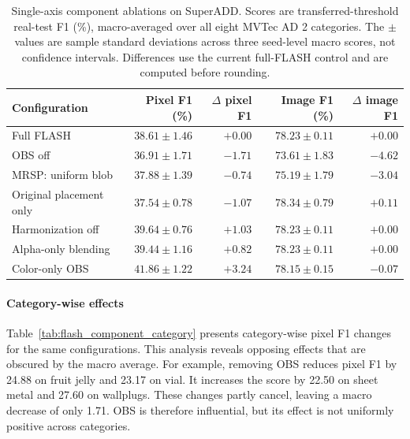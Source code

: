 \begin{table}[t]
    \centering
    \small
    \setlength{\tabcolsep}{6pt}
    \begin{tabular}{lrrrr}
        \hline
        \textbf{Configuration} & \textbf{Pixel F1 (\%)} &
        \textbf{$\Delta$ pixel F1} & \textbf{Image F1 (\%)} &
        \textbf{$\Delta$ image F1} \\
        \hline
        Full FLASH & $38.61 \pm 1.46$ & $+0.00$ & $78.23 \pm 0.11$ & $+0.00$ \\
        OBS off & $36.91 \pm 1.71$ & $-1.71$ & $73.61 \pm 1.83$ & $-4.62$ \\
        MRSP: uniform blob & $37.88 \pm 1.39$ & $-0.74$ & $75.19 \pm 1.79$ & $-3.04$ \\
        Original placement only & $37.54 \pm 0.78$ & $-1.07$ & $78.34 \pm 0.79$ & $+0.11$ \\
        Harmonization off & $39.64 \pm 0.76$ & $+1.03$ & $78.23 \pm 0.11$ & $+0.00$ \\
        Alpha-only blending & $39.44 \pm 1.16$ & $+0.82$ & $78.23 \pm 0.11$ & $+0.00$ \\
        Color-only OBS & $41.86 \pm 1.22$ & $+3.24$ & $78.15 \pm 0.15$ & $-0.07$ \\
        \hline
    \end{tabular}
    \caption{Single-axis component ablations on SuperADD.
    Scores are transferred-threshold real-test F1 (\%), macro-averaged over
    all eight MVTec AD 2 categories.
    The $\pm$ values are sample standard deviations across three seed-level
    macro scores, not confidence intervals.
    Differences use the current full-FLASH control and are computed before
    rounding.}
    \label{tab:flash_component_macro}
\end{table}

\paragraph{Category-wise effects}

Table~\ref{tab:flash_component_category} presents category-wise pixel F1
changes for the same configurations.
This analysis reveals opposing effects that are obscured by the macro
average.
For example, removing OBS reduces pixel F1 by 24.88 on fruit jelly and
23.17 on vial.
It increases the score by 22.50 on sheet metal and 27.60 on
wallplugs.
These changes partly cancel, leaving a macro decrease of only 1.71.
OBS is therefore influential, but its effect is not uniformly positive
across categories.

